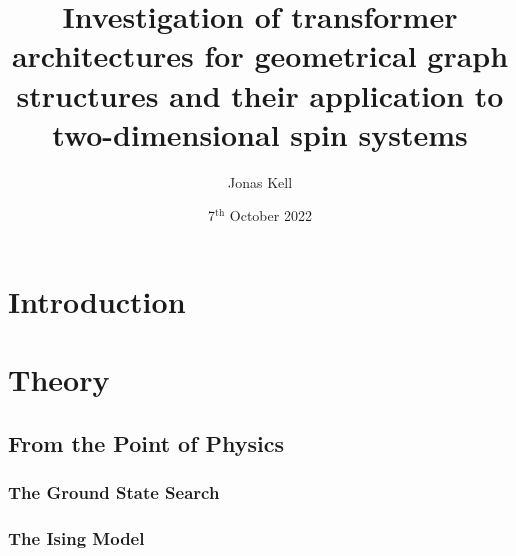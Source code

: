 \documentclass[
headings=optiontohead,              %
12pt,                               %
DIV=13,                             %
twoside=false,                      %
open=right,                         %
BCOR=10mm,                          %
toc=bibliographynumbered            %
]{scrreport}
\title{Investigation of transformer architectures for geometrical graph structures and their application to two-dimensional spin systems} %
\author{Jonas Kell}
\date{7$^\text{th}$ October 2022}
\begin{document}
\thispagestyle{empty}                           %
\cleardoublepage                                %
\pagestyle{scrheadings}                         %
\renewcommand{\contentsname}{Table of Contents} %
\tableofcontents                                %
\cleardoublepage                                %

\clearpairofpagestyles
\ihead{\leftmark}
\ohead{\Ifstr{\leftmark}{\rightmark}{}{\rightmark}}
\cfoot*{\pagemark}


\chapter{Introduction}
\label{sec:introduction}

\FloatBarrier
\chapter{Theory}
\label{sec:theory}
    \section{From the Point of Physics}
        \label{sec:theory-physics}
        
        \FloatBarrier
        \subsection{The Ground State Search}
        \label{sec:theory-groundstatesearch}
        
        \subsection{The Ising Model}
        \label{sec:theory-ising}
        
        \FloatBarrier
\end{document}

